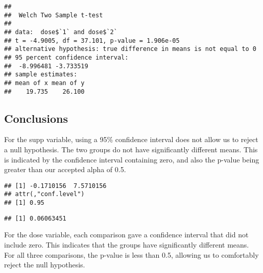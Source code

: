 \documentclass[]{article}
\newenvironment{Shaded}{\begin{snugshade}}{\end{snugshade}}
\newcommand{\NormalTok}[1]{{#1}}
\begin{document}
\begin{verbatim}
## 
##  Welch Two Sample t-test
## 
## data:  dose$`1` and dose$`2`
## t = -4.9005, df = 37.101, p-value = 1.906e-05
## alternative hypothesis: true difference in means is not equal to 0
## 95 percent confidence interval:
##  -8.996481 -3.733519
## sample estimates:
## mean of x mean of y 
##    19.735    26.100
\end{verbatim}

\subsection{Conclusions}\label{conclusions}

For the supp variable, using a 95\% confidence interval does not allow
us to reject a null hypothesis. The two groups do not have significantly
different means. This is indicated by the confidence interval containing
zero, and also the p-value being greater than our accepted alpha of 0.5.

\begin{Shaded}
\end{Shaded}

\begin{verbatim}
## [1] -0.1710156  7.5710156
## attr(,"conf.level")
## [1] 0.95
\end{verbatim}

\begin{Shaded}
\end{Shaded}

\begin{verbatim}
## [1] 0.06063451
\end{verbatim}

For the dose variable, each comparison gave a confidence interval that
did not include zero. This indicates that the groups have significantly
different means. For all three comparisons, the p-value is less than
0.5, allowing us to comfortably reject the null hypothesis.

\begin{Shaded}
\end{Shaded}
\end{document}
